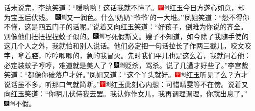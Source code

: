 话未说完，李纨笑道：``嗳哟哟！这话我就不懂了。{\includegraphics[width=3mm]{../Images/00002}\includegraphics[width=3mm]{../Images/00011}\footnotesize \kaishu 红玉今日方遂心如意，却为宝玉后伏线。　\includegraphics[width=3mm]{../Images/00004}\includegraphics[width=3mm]{../Images/00011}\footnotesize \kaishu 又一润色。}什么`奶奶'`爷爷'的一大堆。''凤姐笑道：``怨不得你不懂，这是四五门子的话呢。''说着又向红玉笑道：``好孩子，倒难为你说的齐全。别像他们扭扭捏捏蚊子似的。{\includegraphics[width=3mm]{../Images/00004}\includegraphics[width=3mm]{../Images/00011}\footnotesize \kaishu 写死假斯文。}嫂子不知道，如今除了我随手使的这几个人之外，我就怕和别人说话。他们必定把一句话拉长了作两三截儿，咬文咬字，拿着腔，哼哼唧唧的，急的我冒火。先时我们平儿也是这么着，我就问着他：必定装蚊子哼哼，难道就是美人了？{\includegraphics[width=3mm]{../Images/00004}\includegraphics[width=3mm]{../Images/00011}\footnotesize \kaishu 贬杀，骂杀。}说了几遭才好些了。''李宫裁笑道：``都像你破落户才好。''凤姐又道：``这个丫头就好。{\includegraphics[width=3mm]{../Images/00002}\includegraphics[width=3mm]{../Images/00011}\footnotesize \kaishu 红玉听见了么？}方才说话虽不多，听那口气就简断。''{\includegraphics[width=3mm]{../Images/00002}\includegraphics[width=3mm]{../Images/00011}\footnotesize \kaishu 红玉此刻心内想：可惜晴雯等不在傍。}说着又向红玉笑道：``你明儿伏侍我去罢。我认你作女儿，我再调理调理，你就出息了。''{\includegraphics[width=3mm]{../Images/00004}\includegraphics[width=3mm]{../Images/00011}\footnotesize \kaishu 不假。}

